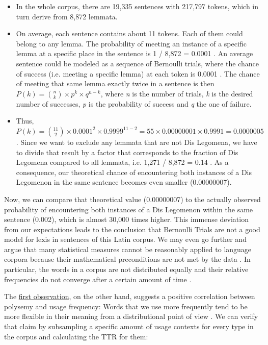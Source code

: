 \documentclass[oneside]{book}
\begin{document}
\begin{itemize}
	\item In the whole corpus, there are 19,335 sentences with 217,797 tokens, which in turn derive from 8,872 lemmata.
	\item On average, each sentence contains about 11 tokens. Each of them could belong to any lemma. The probability of meeting an instance of a specific lemma at a specific place in the sentence is 1 / 8,872 = 0.0001 . An average sentence could be modeled as a sequence of Bernoulli trials, where the chance of success (i.e. meeting a specific lemma) at each token is 0.0001 . The chance of meeting that same lemma exactly twice in a sentence is then \( P(k) = \binom{n}{k} \times p^k \times q^{n-k} \), where \textit{n} is the number of trials, \textit{k} is the desired number of successes, \textit{p} is the probability of success and \textit{q} the one of failure.
	\item Thus, \( P(k) = \binom{11}{2} \times 0.0001^2 \times 0.9999^{11-2} = 55 \times 0.00000001 \times  0.9991 = 0.0000005 \). Since we want to exclude any lemmata that are not Dis Legomena, we have to divide that result by a factor that corresponds to the fraction of Dis Legomena compared to all lemmata, i.e. 1,271 / 8,872 = 0.14 . As a consequence, our theoretical chance of encountering both instances of a Dis Legomenon in the same sentence becomes even smaller (0.00000007).
\end{itemize}

Now, we can compare that theoretical value (0.00000007) to the actually observed probability of encountering both instances of a Dis Legomenon within the same sentence (0.002), which is almost 30,000 times higher. This immense deviation from our expectations leads to the conclusion that Bernoulli Trials are not a good model for lexis in sentences of this Latin corpus. We may even go further and argue that many statistical measures cannot be reasonably applied to language corpora because their mathematical preconditions are not met by the data \parencite[110]{shadrovaMeasuringCoselectionalConstraint2020}. In particular, the words in a corpus are not distributed equally and their relative frequencies do not converge after a certain amount of time \parencite[5]{debowskiNaturalLanguagePerigraphic2018}.

The \hyperref[firstObservation]{first observation}, on the other hand, suggests a positive correlation between polysemy and usage frequency: Words that we use more frequently tend to be more flexible in their meaning from a distributional point of view \parencite[576]{crossleyDevelopmentPolysemyFrequency2010}. We can verify that claim by subsampling a specific amount of usage contexts for every type in the corpus and calculating the \gls{TTR} \parencites[229]{kettunenCanTypetokenRatio2014}[1]{hamiltonDiachronicWordEmbeddings2016} for them:
\end{document}
